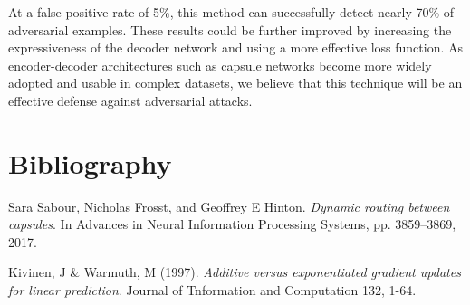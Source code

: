 \documentclass{asaproc}
\begin{document}
At a false-positive rate of 5\%, this method can successfully detect nearly 70\% of adversarial examples. These results could be further improved by increasing the expressiveness of the decoder network and using a more effective loss function. As encoder-decoder architectures such as capsule networks become more widely adopted and usable in complex datasets, we believe that this technique will be an effective defense against adversarial attacks.

%
%

\section*{Bibliography}

Sara Sabour, Nicholas Frosst, and Geoffrey E Hinton. \textit{Dynamic routing between capsules}. In
Advances in Neural Information Processing Systems, pp. 3859–3869, 2017.

Kivinen, J \& Warmuth, M (1997). \textit{Additive versus exponentiated gradient updates for linear
prediction}. Journal of Tnformation and Computation 132, 1-64. 
\end{document}
